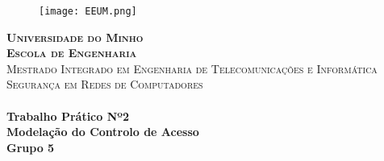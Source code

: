\documentclass[../tp2.tex]{subfiles}
\begin{document}
\begin{titlepage}

\center %
 
\begin{figure}[h]
\centering
\texttt{[image: EEUM.png]} %
\end{figure}

\textsc{\Large \textbf{Universidade do Minho}}\\
\textsc{\large \textbf{Escola de Engenharia}}\\[2cm] %
\textsc{\small Mestrado Integrado em Engenharia de Telecomunicações e Informática}\\[0.5cm] %
\textsc{\normalsize Segurança em Redes de Computadores}\\[2cm] %


\HRule \\[0.4cm]
{\huge \bfseries Trabalho Prático Nº2}  \\ {\large \bfseries Modelação do Controlo de Acesso} \\ {\large \bfseries Grupo 5}  %
\HRule \\[3.5cm]



\end{titlepage}
\end{document}
